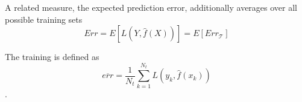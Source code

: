 A related measure, the expected prediction error, additionally averages over all possible training sets
\begin{equation}
Err = E\left[L(Y, \hat{f}(X))\right] = E\left[Err_{\mathcal{T}}\right]
\end{equation}

The training is defined as
\begin{equation}
\overline{err} = \frac{1}{N_t}\sum_{k=1}^{N_t}L(y_k, \hat{f}(x_k))
\end{equation}
.





